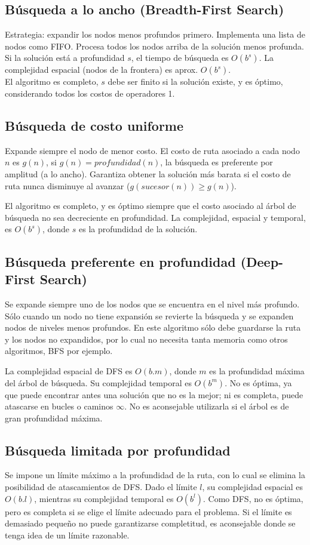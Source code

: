 \subsection{Búsqueda a lo ancho (Breadth-First Search)}
Estrategia: expandir los nodos menos profundos primero. Implementa una lista de
nodos como FIFO. Procesa todos los nodos arriba de la solución menos profunda.
Si la solución está a profundidad $s$, el tiempo de búsqueda es $O(b^s)$.
La complejidad espacial (nodos de la frontera) es aprox. $O(b^s)$.\\
El algoritmo es completo, $s$ debe ser finito si la solución existe, y es
óptimo, considerando todos los costos de operadores 1.

\subsection{Búsqueda de costo uniforme}
Expande siempre el nodo de menor costo. El costo de ruta asociado a cada nodo $n$
es $g(n)$, si $g(n) = profundidad(n)$, la búsqueda es preferente por amplitud (a lo
ancho). Garantiza obtener la solución más barata si el costo de ruta nunca disminuye
al avanzar ($g(sucesor(n)) \geq g(n)$).

El algoritmo es completo, y es óptimo siempre que el costo asociado al árbol de
búsqueda no sea decreciente en profundidad. La complejidad, espacial y temporal,
es $O(b^s)$, donde $s$ es la profundidad de la solución.

\subsection{Búsqueda preferente en profundidad (Deep-First Search)}
Se expande siempre uno de los nodos que se encuentra en el nivel más profundo.
Sólo cuando un nodo no tiene expansión se revierte la búsqueda y se expanden
nodos de niveles menos profundos. En este algoritmo sólo debe guardarse la ruta
y los nodos no expandidos, por lo cual no necesita tanta memoria como otros
algoritmos, BFS por ejemplo.

La complejidad espacial de DFS es $O(b.m)$, donde $m$ es la profundidad máxima
del árbol de búsqueda. Su complejidad temporal es $O(b^m)$. No es óptima, ya que
puede encontrar antes una solución que no es la mejor; ni es completa, puede
atascarse en bucles o caminos $\infty$. No es aconsejable utilizarla si el
árbol es de gran profundidad máxima.

\subsection{Búsqueda limitada por profundidad}
Se impone un límite máximo a la profundidad de la ruta, con lo cual se elimina
la posibilidad de atascamientos de DFS. Dado el límite $l$, su complejidad
espacial es $O(b.l)$, mientras su complejidad temporal es $O(b^l)$. Como DFS,
no es óptima, pero es completa si se elige el límite adecuado para el problema.
Si el límite es demasiado pequeño no puede garantizarse completitud, es
aconsejable donde se tenga idea de un límite razonable.

